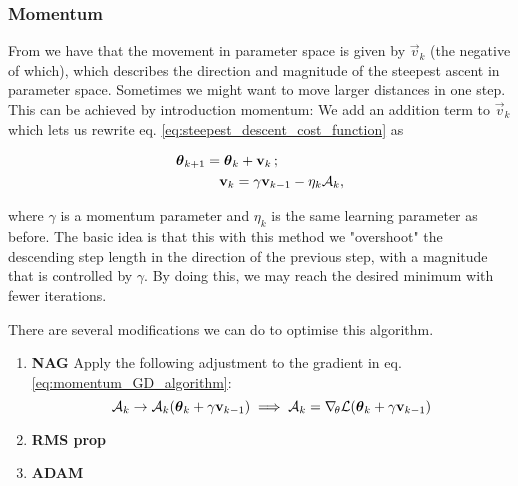     \subsubsection{Momentum}\label{sec:momentum}
        From  we have that the movement in parameter space is given by $\vec{v}_k$ (the negative of which), which describes the direction and magnitude of the steepest ascent in parameter space. Sometimes we might want to move larger distances in one step. This can be achieved by introduction momentum: We add an addition term to $\vec{v}_k$ which lets us rewrite eq. \eqref{eq:steepest_descent_cost_function} as

        \begin{equation}\label{eq:momentum_GD_algorithm}
            \begin{split}
                \boldsymbol{\theta}_{k+1} &= \boldsymbol{\theta}_k + \mathbf{v}_k\, ; \\
                &\quad \mathbf{v}_k =\gamma\mathbf{v}_{k-1} - \eta_k\mathcal{A}_k,
            \end{split}
        \end{equation}

        where $\gamma$ is a momentum parameter and $\eta_k$ is the same learning parameter as before. The basic idea is that this with this method we "overshoot" the descending step length in the direction of the previous step, with a magnitude that is controlled by $\gamma$. By doing this, we may reach the desired minimum with fewer iterations. 

        There are several modifications we can do to optimise this algorithm. \fillertext

        \begin{enumerate}[leftmargin=0pt,labelwidth=!,labelsep=.5em]
            \item[]\textbf{NAG} Apply the following adjustment to the gradient in eq. \eqref{eq:momentum_GD_algorithm}:
            \begin{equation}\label{eq:nag}
                \mathcal{A}_k \to \mathcal{A}_k(\boldsymbol{\theta}_k + \gamma\mathbf{v}_{k-1}) \implies \mathcal{A}_k= \nabla_{\!\theta}\mathcal{L}(\boldsymbol{\theta}_k + \gamma\mathbf{v}_{k-1})
            \end{equation}
            \fillertext
            \item[]\textbf{RMS prop} 
            \item[]\textbf{ADAM} 
        \end{enumerate}
        
